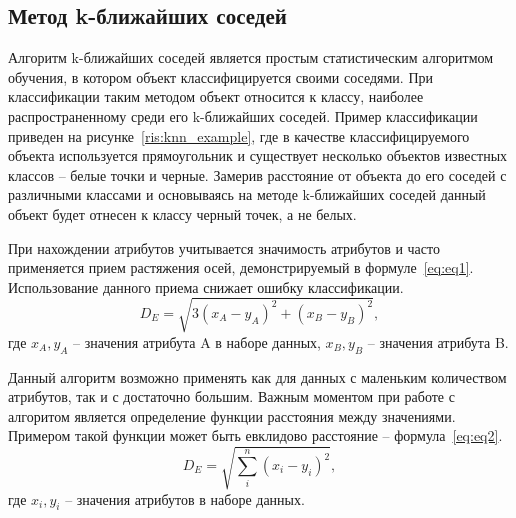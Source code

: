 \subsection{Метод k-ближайших соседей}
Алгоритм k-ближайших соседей является простым статистическим алгоритмом обучения, в котором объект классифицируется своими соседями. При классификации таким методом объект относится к классу, наиболее распространенному среди его k-ближайших соседей. Пример классификации приведен на рисунке~\ref{ris:knn_example}, где в качестве классифицируемого объекта используется прямоугольник и существует несколько объектов известных классов -- белые точки и черные. Замерив расстояние от объекта до его соседей с различными классами и основываясь на методе k-ближайших соседей данный объект будет отнесен к классу черный точек, а не белых.
\\
\par
При нахождении атрибутов учитывается значимость атрибутов и часто применяется прием растяжения осей, демонстрируемый в формуле~\eqref{eq:eq1}. Использование данного приема снижает ошибку классификации.
\begin{equation}\label{eq:eq1}
D_{E} = \sqrt{3(x_{A} - y_{A})^{2} + (x_{B} - y_{B})^{2}},
\end{equation}
где $x_{A}, y_{A}$ -- значения атрибута A в наборе данных, $x_{B}, y_{B}$ -- значения атрибута B.
\par
Данный алгоритм возможно применять как для данных с маленьким количеством атрибутов, так и с достаточно большим. Важным моментом при работе с алгоритом является определение функции расстояния между значениями. Примером такой функции может быть евклидово расстояние -- формула~\eqref{eq:eq2}.
\begin{equation}\label{eq:eq2}
D_{E} = \sqrt{\sum_{i}^{n}(x_{i} - y_{i})^{2}},
\end{equation}
где $x_{i}, y_{i}$ -- значения атрибутов в наборе данных.
